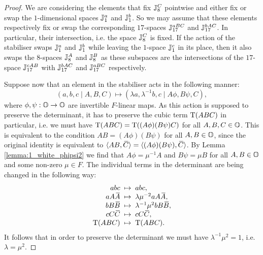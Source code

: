 \begin{proof}
	We are considering the elements that fix $\mathbb{J}_{8}^C$ pointwise
    and either fix or swap the $1$-dimensional spaces $\mathbb{J}_1^a$ and $\mathbb{J}_1^b$. 
    So we may assume that these elements respectively fix or swap the corresponding
    $17$-spaces $\mathbb{J}_{17}^{aBC}$ and $\mathbb{J}_{17}^{bAC}$.
    In particular, their intersection, i.e. the space $\mathbb{J}_{8}^C$ is fixed. If the action of the
     stabiliser
    swaps $\mathbb{J}_1^a$ and $\mathbb{J}_1^b$ while leaving the $1$-space $\mathbb{J}_1^c$ in its
    place, then it also swaps the $8$-spaces $\mathbb{J}_8^A$ and
    $\mathbb{J}_8^B$ as these subspaces are the intersections of the $17$-space
    $\mathbb{J}_{17}^{cAB}$ with $\mathbb{J}_{17}^{bAC}$ and $\mathbb{J}_{17}^{aBC}$ respectively.
    
   	Suppose now that an element in the stabiliser acts in the following manner:
    \begin{equation*}
            (a,b,c\mid A,B,C) \mapsto (\lambda a, \lambda^{-1} b, c \mid
                A \phi, B\psi, C),
    \end{equation*}
    where $\phi, \psi : \mathbb{O} \rightarrow \mathbb{O}$ are invertible $F$-linear maps.
    As this action is supposed to  preserve the determinant, it has to preserve the cubic term
    $\operatorname{T}(ABC)$ in particular, i.e. we must have $\operatorname{T}(ABC) = \operatorname{T}((A\phi) (B\psi) C)$ for all 
    $A,B,C \in \mathbb{O}$. This
    is equivalent to the condition $AB = (A\phi) (B\psi)$ for all $A,B \in \mathbb{O}$, since the 
    original identity is equivalent to
    $\langle AB, \ovC  \rangle = \langle (A\phi)(B\psi) , \ovC  \rangle$.
    By Lemma \ref{lemma:1_white_phipsi2} we find that $A \phi = \mu^{-1} A$ and
    $B \psi = \mu B$ for all $A,B \in \mathbb{O}$ and some non-zero $\mu \in F$. The individual terms in
     the determinant are being
    changed in the following way:
    \begin{equation*}
        \begin{array}{r@{\;\;}c@{\;\;}l}
        abc & \mapsto & abc, \\
        a A \ovA  & \mapsto & \lambda \mu^{-2} a A \ovA , \\
        b B \ovB  & \mapsto & \lambda^{-1} \mu^2 b B \ovB , \\
        c C \ovC  & \mapsto & c C \ovC ,\\
        \Tr(ABC) & \mapsto & \Tr(ABC).
    \end{array}
    \end{equation*}
    It follows that in order to preserve the determinant we must have $\lambda^{-1} \mu^2 = 1$,
    i.e. $\lambda = \mu^2$.
    

\end{proof}
